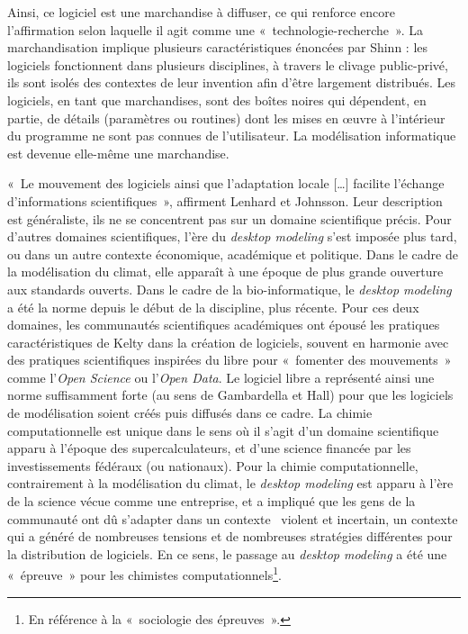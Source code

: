 \documentclass{FramateX}
\begin{document}
\begin{refsection}
Ainsi, ce logiciel est une marchandise à diffuser, ce qui renforce
encore l'affirmation selon laquelle il agit comme une
«~technologie-recherche~». La marchandisation implique plusieurs
caractéristiques énoncées par Shinn : les logiciels fonctionnent dans
plusieurs disciplines, à travers le clivage public-privé, ils sont
isolés des contextes de leur invention afin d'être
largement distribués. Les logiciels, en tant que marchandises, sont des
boîtes noires qui dépendent, en partie, de détails (paramètres ou
routines) dont les mises en œuvre à l'intérieur du
programme ne sont pas connues de l'utilisateur. La
modélisation informatique est devenue elle-même une marchandise.

«~Le mouvement des logiciels ainsi que l'adaptation
locale [\ldots] facilite l'échange
d'informations scientifiques~», affirment Lenhard et
Johnsson. Leur description est généraliste, ils ne se concentrent pas
sur un domaine scientifique précis. Pour d'autres
domaines scientifiques, l'ère du \textit{desktop
modeling} s'est imposée plus tard, ou dans un autre
contexte économique, académique et politique. Dans le cadre de la
modélisation du climat, elle apparaît à une époque de plus grande
ouverture aux standards ouverts. Dans le cadre de la bio-informatique,
le \textit{desktop modeling} a été la norme depuis le début de la
discipline, plus récente. Pour ces deux domaines, les communautés
scientifiques académiques ont épousé les pratiques caractéristiques de
Kelty dans la création de logiciels, souvent en harmonie avec des
pratiques scientifiques inspirées du libre pour «~fomenter des
mouvements~» comme l'\textit{Open Science} ou
l'\textit{Open Data}. Le logiciel libre a
représenté ainsi une norme suffisamment forte (au sens de Gambardella
et Hall) pour que les logiciels de modélisation soient créés puis
diffusés dans ce cadre. La chimie computationnelle est unique dans le
sens où il s'agit d'un domaine
scientifique apparu à l'époque des supercalculateurs,
et d'une science financée par les investissements
fédéraux (ou nationaux). Pour la chimie computationnelle, contrairement
à la modélisation du climat, le \textit{desktop modeling} est
apparu à l'ère de la science vécue comme une
entreprise, et a impliqué que les gens de la communauté ont dû
s'adapter dans un contexte~ violent et incertain, un
contexte qui a généré de nombreuses tensions et de nombreuses
stratégies différentes pour la distribution de logiciels. En ce sens,
le passage au \textit{desktop modeling} a été une «~épreuve~» pour
les chimistes computationnels\footnote{En référence à la «~sociologie
des épreuves~».}.


\end{refsection}
\end{document}

